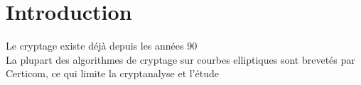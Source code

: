 \newpage
\section{Introduction}
Le cryptage existe déjà depuis les années 90\\
La plupart des algorithmes de cryptage sur courbes elliptiques sont brevetés par Certicom, ce qui limite la cryptanalyse et l'étude 
